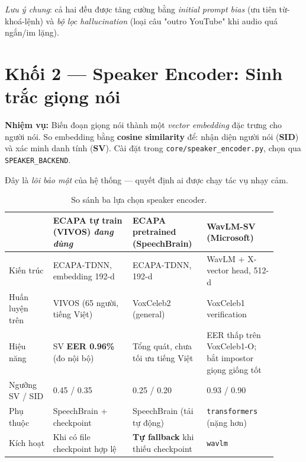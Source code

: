 \documentclass[12pt,a4paper]{article}
\newcommand{\role}[1]{\par\smallskip\noindent\textbf{\textcolor{hdr}{Nhiệm vụ:}} #1\par\smallskip}
\begin{document}
\noindent\textit{Lưu ý chung}: cả hai đều được tăng cường bằng \emph{initial
prompt bias} (ưu tiên từ-khoá-lệnh) và \emph{bộ lọc hallucination} (loại câu
"outro YouTube" khi audio quá ngắn/im lặng).

\section{Khối 2 --- Speaker Encoder: Sinh trắc giọng nói}
\role{Biến đoạn giọng nói thành một \emph{vector embedding} đặc trưng cho người
nói. So embedding bằng \textbf{cosine similarity} để: nhận diện người nói
(\textbf{SID}) và xác minh danh tính (\textbf{SV}). Cài đặt trong
\texttt{core/speaker\_encoder.py}, chọn qua \texttt{SPEAKER\_BACKEND}.}

Đây là \emph{lõi bảo mật} của hệ thống --- quyết định ai được chạy tác vụ nhạy cảm.

\begin{table}[H]
\centering
\caption{So sánh ba lựa chọn speaker encoder.}
\small
\begin{tabular}{p{0.15\linewidth}p{0.27\linewidth}p{0.24\linewidth}p{0.24\linewidth}}
\toprule
& \textbf{ECAPA tự train (VIVOS)} \newline \textit{đang dùng}
& \textbf{ECAPA pretrained} \newline (SpeechBrain)
& \textbf{WavLM-SV} \newline (Microsoft) \\
\midrule
Kiến trúc & ECAPA-TDNN, embedding 192-d & ECAPA-TDNN, 192-d & WavLM + X-vector head, 512-d \\
Huấn luyện trên & VIVOS (65 người, tiếng Việt) & VoxCeleb2 (general) & VoxCeleb1 verification \\
Hiệu năng & SV \textbf{EER 0.96\%} (đo nội bộ) & Tổng quát, chưa tối ưu tiếng Việt
& EER thấp trên VoxCeleb1-O; bắt impostor giọng giống tốt \\
Ngưỡng SV / SID & 0.45 / 0.35 & 0.25 / 0.20 & 0.93 / 0.90 \\
Phụ thuộc & SpeechBrain + checkpoint & SpeechBrain (tải tự động) & \texttt{transformers} (nặng hơn) \\
Kích hoạt & Khi có file checkpoint hợp lệ & \textbf{Tự fallback}
khi thiếu checkpoint & \texttt{wavlm} \\
\bottomrule
\end{tabular}
\end{table}
\end{document}
